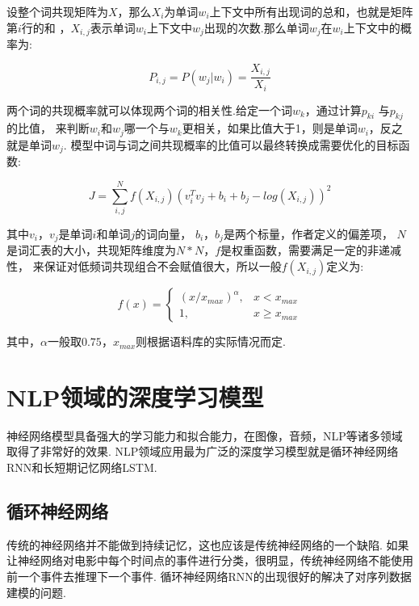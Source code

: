 \documentclass[bachelor,winfonts]{jnuthesis}
\begin{document}
设整个词共现矩阵为$X$，那么$X_{i}$为单词$w_{i}$上下文中所有出现词的总和，也就是矩阵第$i$行的和
，$X_{i,j}$表示单词$w_{i}$上下文中$w_{j}$出现的次数.那么单词$w_{j}$在$w_{i}$上下文中的概率为:

\begin{equation}
  P_{i,j} = P(w_{j}|w_{i}) = \frac{X_{i,j}}{X_{i}}
\end{equation}

两个词的共现概率就可以体现两个词的相关性.给定一个词$w_{k}$，通过计算$p_{ki}$ 与$p_{kj}$的比值，
来判断$w_{i}$和$w_{j}$哪一个与$w_{k}$更相关，如果比值大于1，则是单词$w_{i}$，反之就是单词$w_{j}$.
模型中词与词之间共现概率的比值可以最终转换成需要优化的目标函数:

\begin{equation}
  J = \sum_{i,j}^{N}f(X_{i,j})(v_{i}^{T}v_{j}+b_{i}+b_{j}-log(X_{i,j}))^2
\end{equation}

其中$v_{i}$，$v_{j}$是单词$i$和单词$j$的词向量，
$b_{i}$，$b_{j}$是两个标量，作者定义的偏差项，
$N$是词汇表的大小，共现矩阵维度为$N*N$，$f$是权重函数，需要满足一定的非递减性，
来保证对低频词共现组合不会赋值很大，所以一般$f(X_{i,j})$定义为:

\begin{equation}
  f(x) = 
  \left\{
    \begin{array}{lr}
      (x/x_{max})^{\alpha}, & x<x_{max} \\
      1, & x \ge x_{max} 
    \end{array}
    \right.
\end{equation}

其中，$\alpha$一般取$0.75$，$x_{max}$则根据语料库的实际情况而定.


\section{NLP领域的深度学习模型}
神经网络模型具备强大的学习能力和拟合能力，在图像，音频，NLP等诸多领域取得了非常好的效果.
NLP领域应用最为广泛的深度学习模型就是循环神经网络RNN和长短期记忆网络LSTM.

\subsection{循环神经网络}
传统的神经网络并不能做到持续记忆，这也应该是传统神经网络的一个缺陷.
如果让神经网络对电影中每个时间点的事件进行分类，很明显，传统神经网络不能使用前一个事件去推理下一个事件.
循环神经网络RNN的出现很好的解决了对序列数据建模的问题.
\end{document}
